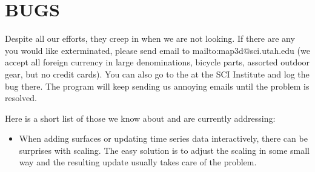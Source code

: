 
\section{BUGS}
\label{sec:bugs}

Despite all our efforts, they creep in when we are not looking.  If
there are any you would like exterminated, please send email to
 {mailto:map3d@sci.utah.edu} (we
accept all foreign currency in large denominations, bicycle parts, assorted
outdoor gear, but no credit cards).  You can also go to the 
 at the SCI
Institute and log the bug there.  The program will keep sending us annoying
emails until the problem is resolved.

Here is a short list of those we know about and are currently addressing:

\begin{itemize}
  \item When adding surfaces or updating time series data interactively,
    there can be surprises with scaling.  The easy solution is to adjust
    the scaling in some small way and the resulting update usually takes
    care of the problem.
\end{itemize}

